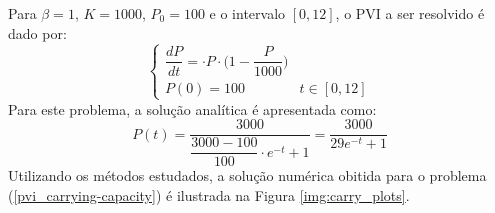 Para $\beta = 1$, $K = 1000$, $P_0 = 100$ e o intervalo $[0, 12]$, o PVI a ser resolvido é dado por:
\begin{equation}\label{pvi_carrying-capacity}
    \begin{cases}
	\dfrac{dP}{dt} = \cdot P \cdot \bigg(1 - \dfrac{P}{1000}\bigg) & \\
        P(0) = 100 & t \in [0, 12]
    \end{cases}
\end{equation}
Para este problema, a solução analítica é apresentada como:
\begin{equation*}
    P(t) = \dfrac{3000}{\dfrac{3000 - 100}{100} \cdot e^{-t} + 1} = \dfrac{3000}{29e^{-t} + 1}
\end{equation*}
Utilizando os métodos estudados, a solução numérica obitida para o problema (\ref{pvi_carrying-capacity}) é ilustrada na Figura \ref{img:carry_plots}.
